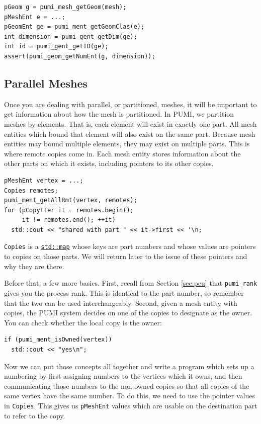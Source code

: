 \documentclass{article}
\begin{document}
\begin{lstlisting}
pGeom g = pumi_mesh_getGeom(mesh);
pMeshEnt e = ...;
pGeomEnt ge = pumi_ment_getGeomClas(e);
int dimension = pumi_gent_getDim(ge);
int id = pumi_gent_getID(ge);
assert(pumi_geom_getNumEnt(g, dimension));
\end{lstlisting}

\subsection{Parallel Meshes}

Once you are dealing with parallel, or partitioned, meshes,
it will be important to get information about how the
mesh is partitioned.
In PUMI, we partition meshes by elements.
That is, each element will exist in exactly one part.
All mesh entities which bound that element will also exist on
the same part.
Because mesh entities may bound multiple elements, they may
exist on multiple parts.
This is where remote copies come in.
Each mesh entity stores information about the other parts
on which it exists, including pointers to its other copies.

\begin{lstlisting}
pMeshEnt vertex = ...;
Copies remotes;
pumi_ment_getAllRmt(vertex, remotes);
for (pCopyIter it = remotes.begin();
     it != remotes.end(); ++it)
  std::cout << "shared with part " << it->first << '\n;
\end{lstlisting}

\texttt{Copies} is a
\href{http://www.cplusplus.com/reference/map/map/}{\texttt{std::map}}
whose keys are part numbers and whose
values are pointers to copies on those parts.
We will return later to the issue of these pointers and
why they are there.

Before that, a few more basics.
First, recall from Section \ref{sec:pcu} that \texttt{pumi\_rank}
gives you the process rank.
This is identical to the part number, so remember that the two
can be used interchangeably.
Second, given a mesh entity with copies, the PUMI system decides
on one of the copies to designate as the owner.
You can check whether the local copy is the owner:

\begin{lstlisting}
if (pumi_ment_isOwned(vertex))
  std::cout << "yes\n";
\end{lstlisting}

Now we can put those concepts all together and write a program
which sets up a numbering by first assigning numbers to
the vertices which it owns, and then communicating those
numbers to the non-owned copies so that all copies
of the same vertex have the same number.
To do this, we need to use the pointer values in \texttt{Copies}.
This gives us \texttt{pMeshEnt} values which are usable
on the destination part to refer to the copy.
\end{document}
